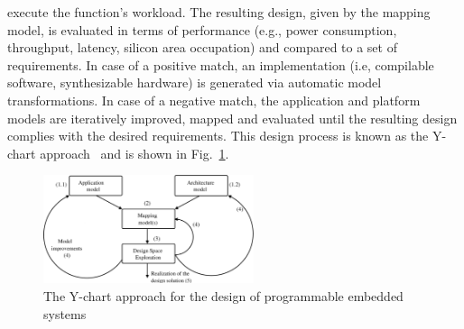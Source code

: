 \documentclass{llncs}
\begin{document}
execute the function's workload. The resulting design, given by the mapping model, is evaluated in terms
of performance (e.g., power consumption, throughput, latency, silicon area occupation) and compared to a set of
requirements. In case of a positive match, an implementation (i.e, compilable software, synthesizable hardware) is
generated via automatic model transformations. In case of a negative match, the application and platform models are
iteratively improved, mapped and evaluated until the resulting design complies with the desired requirements.
This design process is known as the Y-chart approach~\cite{YChart} and is shown in Fig.~\ref{fig:Ychart}.
%
\begin{figure}[htbp]
	\centering
	\includegraphics[width=0.55\textwidth]{./figures/ApproachY.pdf}
	\caption{The Y-chart approach for the design of programmable embedded systems}
	\label{fig:Ychart}
\end{figure}
%
\newpage
\end{document}
